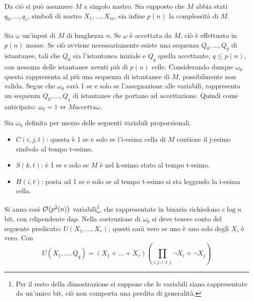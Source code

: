 \documentclass{subfiles}
\begin{document}
\begin{Theorem*}[di Cook]
\begin{Proof*}
        Da ciò si può assumere \(M\) a singolo nastro. Sia supposto che \(M\) abbia stati \(q_{0}, \ldots, q_{s}\), simboli di nastro \(X_{1}, \ldots, X_{m}\),
        sia infine \(p(n)\) la complessità di \(M\).
        \\ \\
        Sia \(\omega\) un'input di \(M\) di lunghezza \(n\). Se \(\omega\) è accettata da \(M\), ciò è effettuato in \(p(n)\) mosse.
        Se ciò avviene necessariamente esiste una sequenza \(Q_{0}, \ldots, Q_{q}\) di istantanee, tali che \(Q_{0}\) sia l'istantanea iniziale e \(Q_{q}\) quella accettante,
        \(q \le p(n)\), con nessuna delle istantanee aventi più di \(p(n)\) celle.
        Considerando dunque \(\omega_{0}\) questa rappresenta al più una sequenza di istantanee di \(M\), possibilmente non valida.
        Segue che \(\omega_{0}\) sarà 1 se e solo se l'assegnazione alle variabili, rappresenta un sequenza \(Q_{0}, \ldots, Q_{q}\) di istantanee che portano ad accettazione.
        Quindi come anticipato: \(\omega_{0} = 1 \iff M \text{accetta} \omega\).
        \clearpage

        Sia \(\omega_{0}\) definita per mezzo delle seguenti variabili proporzionali.
        \begin{itemize}
            \item \(C(i, j, t)\): questa è 1 se e solo se l'i-esima cella di \(M\) contiene il j-esimo simbolo al tempo t-esimo.
            \item \(S(k, t)\): è 1 se e solo se \(M\) è nel k-esimo stato al tempo t-esimo.
            \item \(H(i, t)\): posta ad 1 se e solo se al tempo t-esimo si sta leggendo la i-esima cella.
        \end{itemize}

        \noindent Si anno cosi \(\order{p^{2}(n)}\) variabili\footnote[12]{Per il resto della dimostrazione si suppone che le variabili siano rappresentate da un'unico bit, ciò non comporta una perdita di generalità.},
        che rappresentate in binario richiedono \(c \log n\) bit, con \(c \text{dipendente da} p\).
        Nella costruzione di \(\omega_{0}\) si deve tenere conto del seguente predicato: \(U(X_{1}, \ldots, X_{r})\); questi sarà vero se uno è uno solo degli \(X_{i}\) è vero.
        Con
        \[
            U(X_{1}, \ldots, Q_{q}) = (X_{1} + \ldots + X_{r})\left(\prod\limits_{i, j, i \ne j}{\lnot X_{i} + \lnot X_{j}}\right)
        \]


\end{Proof*}
\end{Theorem*}
\end{document}
